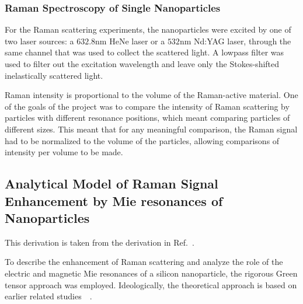         \subsubsection{Raman Spectroscopy of Single Nanoparticles}
        \label{sec:Raman}
                For the Raman scattering experiments, the nanoparticles were excited by one of two laser sources: a $632.8$nm HeNe laser
            or a $532$nm Nd:YAG laser, through the same channel that was used to collect the scattered light. A lowpass filter was used
            to filter out the excitation wavelength and leave only the Stokes-shifted inelastically scattered light.

                Raman intensity is proportional to the volume of the Raman-active material. One of the goals of the project was to compare
            the intensity of Raman scattering by particles with different resonance positions, which meant comparing particles of different
            sizes. This meant that for any meaningful comparison, the Raman signal had to be normalized to the volume of the particles, allowing
            comparisons of intensity per volume to be made.

    \subsection{Analytical Model of Raman Signal Enhancement by Mie resonances of Nanoparticles}
        \label{sec:Theory}
            This derivation is taken from the derivation in Ref.~.

            To describe the enhancement of Raman scattering and analyze the role of the electric and magnetic
        Mie resonances of a silicon nanoparticle, the rigorous Green tensor approach was employed. Ideologically,
        the theoretical approach is based on earlier related studies~~\cite{canccado2014theory, murphy1983enhanced}.

